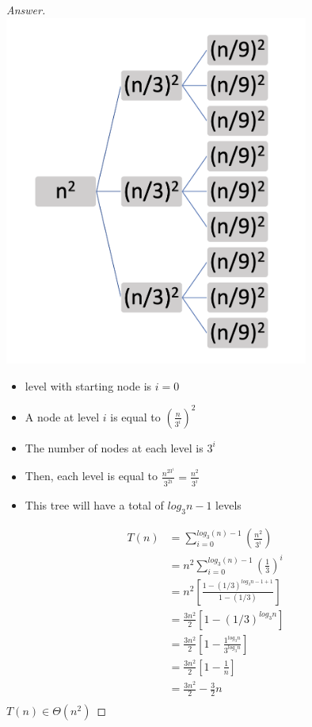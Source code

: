 \documentclass[11pt]{article}
\theoremstyle{definition}
\theoremstyle{definition}
\theoremstyle{definition}
\begin{document}
\begin{proof}[Answer] $ $ \\
\includegraphics[width=100mm]{prob1.png} \\
\begin{itemize}
    \item level with starting node is $i=0$
    \item A node at level $i$ is equal to $\left( \frac{n}{3^i}\right)^2$ 
    \item The number of nodes at each level is $3^i$
    \item Then, each level is equal to $\frac{n^23^i}{3^{2i}} = \frac{n^2}{3^i}$
    \item This tree will have a total of $log_3n - 1$ levels
\end{itemize}
\begin{align*}
    T(n) &= \sum_{i=0}^{log_3(n)-1} \left( \frac{n^2}{3^i}\right) \\
    &= n^2 \sum_{i=0}^{log_3(n)-1} \left( \frac{1}{3}\right)^i \\
    &= n^2 \left[\frac{1 - (1/3) ^ {log_3n-1+1}}{1-(1/3)}\right] \\
    &= \frac{3n^2}{2}\left[ 1 - (1/3)^{log_3n} \right] \\
    &= \frac{3n^2}{2}\left[ 1 - \frac{1^{log_3n}}{3^{log_3n}} \right] \\
    &= \frac{3n^2}{2}\left[ 1 - \frac{1}{n} \right] \\
    &= \frac{3n^2}{2} - \frac{3}{2} n \\
\end{align*}
$T(n) \in \Theta(n^2)$
\end{proof}
\end{document}
